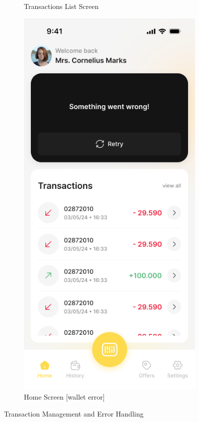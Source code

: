 \begin{figure}[H]
\begin{subfigure}[b]{0.32\textwidth}
        \caption{Transactions List Screen}
        \label{fig:transactions_list_screen}
    \end{subfigure}
    \hfill
    \begin{subfigure}[b]{0.32\textwidth}
        \centering
        \includegraphics[width=\textwidth]{images/home_screen_wallet_error.png}
        \caption{Home Screen [wallet error]}
        \label{fig:home_screen_wallet_error}
    \end{subfigure}
    \caption{Transaction Management and Error Handling}
    \label{fig:transaction_management}
\end{figure}

